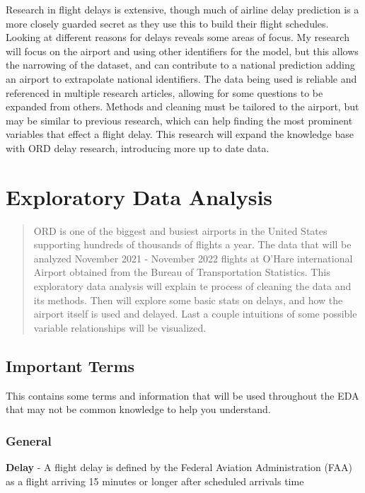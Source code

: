 \documentclass[a4paper,12pt]{article}
\begin{document}
Research in flight delays is extensive, though much of airline delay prediction is a more closely guarded secret as they use this to build their flight schedules. Looking at different reasons for delays reveals some areas of focus.
 My research will focus on the airport and using other identifiers for the model, but this allows the narrowing of the dataset, and can contribute to a national prediction adding an airport to extrapolate national identifiers.
  The data being used is reliable and referenced in multiple research articles,
  allowing for some questions to be expanded from others. Methods and cleaning must be tailored to the airport, but may be similar to previous research, which can help finding the most prominent variables that effect a flight delay.
   This research will expand the knowledge base with ORD delay research, introducing more up to date data.

\pagebreak

\section{Exploratory Data Analysis}

\begin{abstract}
    ORD is one of the biggest and busiest airports in the United States supporting hundreds of thousands of flights a year.
    The data that will be analyzed November 2021 - November 2022 flights at O'Hare international Airport obtained from the Bureau of Transportation Statistics.   
    This exploratory data analysis will explain te process of cleaning the data and its methods. Then will explore some basic stats on delays, and how the airport itself is used 
    and delayed. Last a couple intuitions of some possible variable relationships will be visualized.
\end{abstract}

\pagebreak

\subsection{Important Terms}
This contains some terms and information that will be used throughout the EDA that may not be common knowledge to help you understand. 

\subsubsection{General}

\textbf{Delay} - A flight delay is defined by the Federal Aviation Administration (FAA) as a flight arriving 15 minutes or longer after scheduled arrivals time
\end{document}
